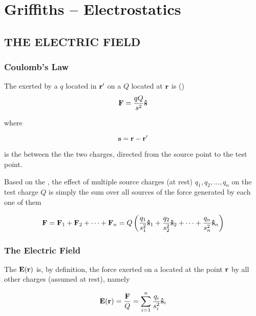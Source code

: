 \chapter{Griffiths -- Electrostatics}
\label{ch:Griffiths_01} 

\section{THE ELECTRIC FIELD}
\subsection{Coulomb's Law}
The  exerted by a  $q$ located  in $\vb{r}'$ on a  $Q$ located at $\vb{r}$  is ()
\begin{equation}
\label{eq:G01_coulomb}
\vb{F} = \frac{qQ}{s^2} \vu{s}
\end{equation}

where 

\begin{equation}
\label{eq:G01_separation}
\vb{s} = \vb{r} - \vb{r}'
\end{equation}

is the  between the the two charges, directed from the source point to the test point. 

Based on the , the effect of multiple source charges (at rest) $q_1, q_2, \ldots, q_n$ on the test charge $Q$ is simply the sum over all sources of the force generated by each one of them

\begin{equation}
\label{eq:G01_superposition}
\vb{F} =  \vb{F}_1 + \vb{F}_2 + \cdots + \vb{F}_n = Q \left( \frac{q_1}{s_1^2} \vu{s}_1 + \frac{q_2}{s_2^2} \vu{s}_2 + \cdots + \frac{q_n}{s_n^2} \vu{s}_n \right)
\end{equation}

\subsection{The Electric Field}
The  $\vb{E}(\vb{r})$ is, by definition, the force exerted on a  located at the point $\vb{r}$ by all other charges (assumed at rest), namely

\begin{equation}
\label{eq:G01_electrostatic_field}
\vb{E}(\vb{r}) = \frac{\vb{F}}{Q} =  \sum_{i=1}^n \frac{q_i}{s_i^2} \vu{s}_i
\end{equation}

